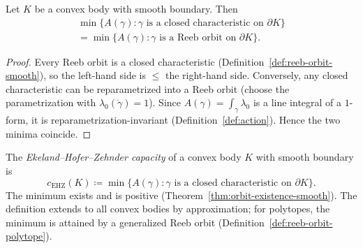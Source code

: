 \begin{lemma}\label{lem:action-minima-coincide}
Let $K$ be a convex body with smooth boundary. Then
\begin{multline*}
  \min\{ A(\gamma) : \gamma \text{ is a closed characteristic on } \partial K \}
  \\= \min\{ A(\gamma) : \gamma \text{ is a Reeb orbit on } \partial K \}.
\end{multline*}
\end{lemma}

\begin{proof}
Every Reeb orbit is a closed characteristic
(Definition~\ref{def:reeb-orbit-smooth}), so the left-hand side is
${\leq}$ the right-hand side.
Conversely, any closed characteristic can be reparametrized into a Reeb
orbit (choose the parametrization with
$\lambda_0(\dot{\gamma}) = 1$).
Since $A(\gamma) = \int_\gamma \lambda_0$ is a line integral of a
$1$-form, it is reparametrization-invariant
(Definition~\ref{def:action}).
Hence the two minima coincide.
\end{proof}

\begin{definition}\label{def:ehz-capacity}
The \emph{Ekeland--Hofer--Zehnder capacity} of a convex body $K$ with smooth
boundary is
\[
  c_{\mathrm{EHZ}}(K) \coloneqq \min\bigl\{ A(\gamma) :
  \gamma \text{ is a closed characteristic on } \partial K \bigr\}.
\]
The minimum exists and is positive (Theorem~\ref{thm:orbit-existence-smooth}).
The definition extends to all convex bodies by approximation;
for polytopes, the minimum is attained by a generalized Reeb orbit
(Definition~\ref{def:reeb-orbit-polytope}).
\end{definition}

